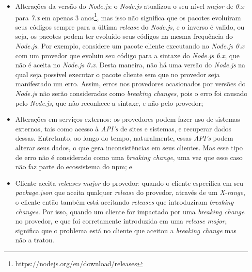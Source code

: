 \begin{itemize}
    \item Alterações da versão do \textit{Node.js}: o \textit{Node.js} atualizou o seu nível \textit{major} de \textit{0.x} para \textit{7.x} em apenas 3 anos\footnote{https://nodejs.org/en/download/releases}, mas isso não significa que os pacotes evoluíram seus códigos sempre para a última \textit{release} do \textit{Node.js}, e o inverso é valido, ou seja, os pacotes podem ter evoluído seus códigos na mesma frequência do \textit{Node.js}. Por exemplo, considere um pacote cliente executando no \textit{Node.js 0.x} com um provedor que evoluiu seu código para a sintaxe do \textit{Node.js 6.x}, que não é aceita no \textit{Node.js 0.x}. Desta maneira, não há uma versão do \textit{Node.js}  na qual seja possível executar o pacote cliente sem que no provedor seja manifestado um erro. Assim, erros nos provedores ocasionados por versões do \textit{Node.js} não serão considerados como \textit{breaking changes}, pois o erro foi causado pelo \textit{Node.js}, que não reconhece a sintaxe, e não pelo provedor;

    \item Alterações em serviços externos: os provedores podem fazer uso de sistemas externos, tais como acesso à \textit{API's} de sites e sistemas, e recuperar dados dessas. Entretanto, ao longo do tempo, naturalmente, essas \textit{API's} podem alterar seus dados, o que gera inconsistências em seus clientes. Mas esse tipo de erro não é considerado como uma \textit{breaking change}, uma vez que esse caso não faz parte do ecossistema do \gls{npm}; e
    \item Cliente aceita \textit{releases major} do provedor: quando o cliente especifica em seu \textit{package.json} que aceita qualquer \textit{release} do provedor, através de um \textit{X-range}, o cliente então também está aceitando \textit{releases} que introduziram \textit{breaking changes}. Por isso, quando um cliente for impactado por uma \textit{breaking change} no provedor, e que foi corretamente introduzida em uma \textit{release major}, significa que o problema está no cliente que aceitou a \textit{breaking change} mas não a tratou.
\end{itemize}{}

